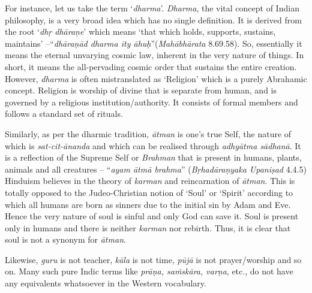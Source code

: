 For instance, let us take the term ‘\textit{dharma}’. \textit{Dharma}, the vital concept of Indian philosophy, is a very broad idea which has no single definition. It is derived from the root ‘\textit{dhṛ dhāraṇe}’ which means ‘that which holds, supports, sustains, maintains’ –“\textit{dhāraṇād dharma ity āhuḥ}”(\textit{Mahābhārata} 8.69.58). So, essentially it means the eternal unvarying cosmic law, inherent in the very nature of things. In short, it means the all-pervading cosmic order that sustains the entire creation. However, \textit{dharma} is often mistranslated as ‘Religion’ which is a purely Abrahamic concept. Religion is worship of divine that is separate from human, and is governed by a religious institution/authority. It consists of formal members and follows a standard set of rituals. 

Similarly, as per the dharmic tradition, \textit{ātman} is one’s true Self, the nature of which is \textit{sat-cit-ānanda} and which can be realised through \textit{adhyātma sādhanā}. It is a reflection of the Supreme Self or \textit{Brahman} that is present in humans, plants, animals and all creatures – “\textit{ayam ātmā brahma}” (\textit{Bṛhadāraṇyaka Upaniṣad} 4.4.5) Hinduism believes in the theory of \textit{karman} and reincarnation of \textit{ātman}. This is totally opposed to the Judeo-Christian notion of ‘Soul’ or ‘Spirit’ according to which all humans are born as sinners due to the initial sin by Adam and Eve. Hence the very nature of soul is sinful and only God can save it. Soul is present only in humans and there is neither \textit{karman} nor rebirth. Thus, it is clear that soul is not a synonym for \textit{ātman}.

Likewise, \textit{guru} is not teacher, \textit{kāla} is not time, \textit{pūjā} is not prayer/worship and so on. Many such pure Indic terms like \textit{prāṇa, saṁskāra, varṇa}, etc., do not have any equivalents whatsoever in the Western vocabulary.

